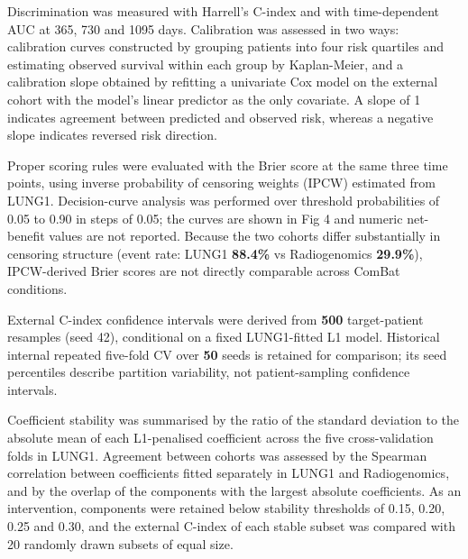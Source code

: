 \documentclass[a4paper,fleqn]{cas-sc}
\begin{document}
Discrimination was measured with Harrell's C-index and with time-dependent AUC at 365, 730 and 1095 days. Calibration was assessed in two ways: calibration curves constructed by grouping patients into four risk quartiles and estimating observed survival within each group by Kaplan-Meier, and a calibration slope obtained by refitting a univariate Cox model on the external cohort with the model's linear predictor as the only covariate. A slope of 1 indicates agreement between predicted and observed risk, whereas a negative slope indicates reversed risk direction.

Proper scoring rules were evaluated with the Brier score at the same three time points, using inverse probability of censoring weights (IPCW) estimated from LUNG1. Decision-curve analysis was performed over threshold probabilities of 0.05 to 0.90 in steps of 0.05; the curves are shown in Fig 4 and numeric net-benefit values are not reported. Because the two cohorts differ substantially in censoring structure (event rate: LUNG1 \textbf{88.4\%} vs Radiogenomics \textbf{29.9\%}), IPCW-derived Brier scores are not directly comparable across ComBat conditions.

External C-index confidence intervals were derived from \textbf{500} target-patient resamples (seed 42), conditional on a fixed LUNG1-fitted L1 model. Historical internal repeated five-fold CV over \textbf{50} seeds is retained for comparison; its seed percentiles describe partition variability, not patient-sampling confidence intervals.

Coefficient stability was summarised by the ratio of the standard deviation to the absolute mean of each L1-penalised coefficient across the five cross-validation folds in LUNG1. Agreement between cohorts was assessed by the Spearman correlation between coefficients fitted separately in LUNG1 and Radiogenomics, and by the overlap of the components with the largest absolute coefficients. As an intervention, components were retained below stability thresholds of 0.15, 0.20, 0.25 and 0.30, and the external C-index of each stable subset was compared with 20 randomly drawn subsets of equal size.
\end{document}
